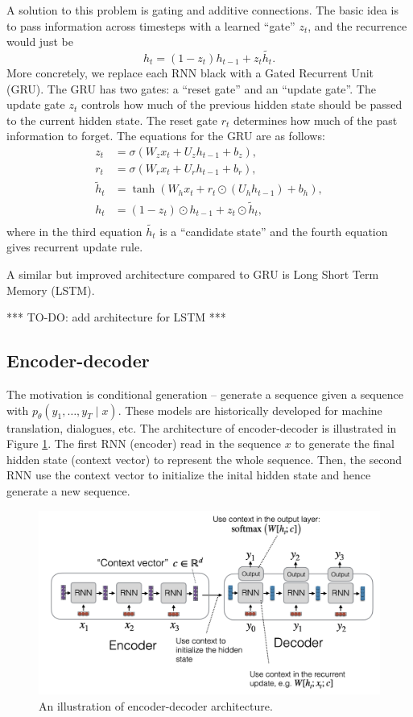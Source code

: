 \documentclass[a4paper]{article}
\begin{document}
A solution to this problem is gating and additive 
connections. The basic idea is to 
pass information across timesteps with a learned 
``gate'' $z_t$, and the recurrence would just be 
\[
h_t = (1 - z_t) h_{t-1} + z_t \tilde{h_t}.
\]
More concretely, we replace each RNN black with a Gated 
Recurrent Unit (GRU). 
The GRU has two gates: a ``reset gate'' and an ``update gate''.
The update gate $z_t$ controls how much of the previous 
hidden state should be passed to the current hidden state. 
The reset gate $r_t$ determines how much of the past 
information to forget.
The equations for the GRU are as follows:
\[
\begin{aligned}
z_t &= \sigma(W_z x_t + U_z h_{t-1} + b_z), \\
r_t &= \sigma(W_r x_t + U_r h_{t-1} + b_r), \\
\tilde{h}_t &= \tanh(W_h x_t + r_t \odot (U_h h_{t-1}) + b_h), \\
h_t &= (1 - z_t) \odot h_{t-1} + z_t \odot \tilde{h}_t, \\
\end{aligned}
\]
where in the third equation $\tilde{h_t}$ is a ``candidate state''
and the fourth equation gives recurrent update rule.

A similar but improved architecture compared to GRU 
is Long Short Term Memory (LSTM).

*** TO-DO: add architecture for LSTM ***

\subsection{Encoder-decoder}

The motivation is conditional generation -- generate 
a sequence given a sequence with $p_\theta (y_1, \dots, y_T 
\mid x)$. These models are historically developed for machine 
translation, dialogues, etc.
The architecture of encoder-decoder is 
illustrated in Figure \ref{encode-decode}. The first 
RNN (encoder) read in the sequence $x$ to generate 
the final hidden state (context vector) to represent the whole sequence. 
Then, the second RNN use the context vector to initialize
the inital hidden state and hence generate a new sequence.

\begin{figure}[h!]
  \centering
  \includegraphics[width=0.6\linewidth]{figs/encode-decode.png}
  \caption{An illustration of encoder-decoder architecture.}
  \label{encode-decode}
\end{figure}
\end{document}
